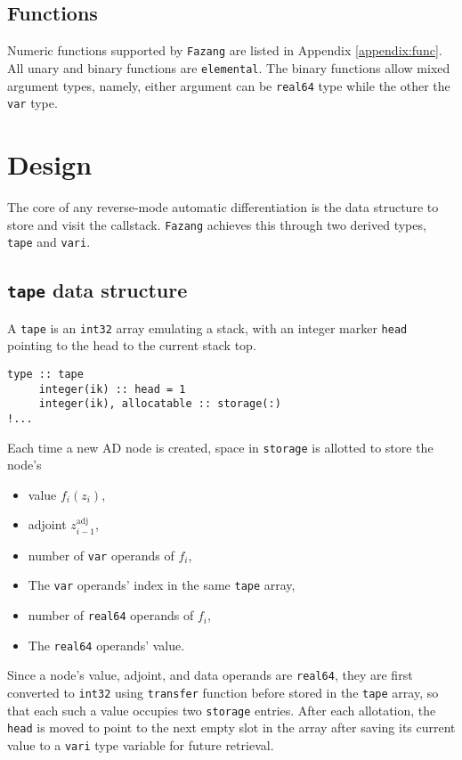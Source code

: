 \documentclass[12pt, reqno, oneside]{amsbook}
\begin{document}
\section{Functions}
\label{sec:orgd457f45}
Numeric functions supported by \texttt{Fazang} are listed in Appendix \ref{appendix:func}. All unary and
binary functions are \texttt{elemental}. The binary functions allow mixed
argument types, namely, either argument can be \texttt{real64} type while the
other the \texttt{var} type.

\chapter{Design}
\label{sec:org148af80}
The core of any reverse-mode automatic differentiation is the data
structure to store and visit the callstack. \texttt{Fazang} achieves this
through two derived types, \texttt{tape} and \texttt{vari}.

\section{\texttt{tape} data structure}
\label{sec:org1c22665}
A \texttt{tape} is an \texttt{int32} array emulating a stack, with an integer marker \texttt{head} pointing to the
head to the current stack top.
\begin{verbatim}
type :: tape
     integer(ik) :: head = 1
     integer(ik), allocatable :: storage(:)
!...
\end{verbatim}
Each time a new AD node is created,
space in \texttt{storage} is allotted to store the node's
\begin{itemize}
\item value \(f_i(z_i)\),
\item adjoint \(z_{i-1}^{\text{adj}}\),
\item number of \texttt{var} operands of \(f_i\),
\item The \texttt{var} operands' index in the same \texttt{tape} array,
\item number of \texttt{real64} operands of \(f_i\),
\item The \texttt{real64} operands' value.
\end{itemize}

Since a node's value, adjoint, and data
operands are \texttt{real64}, they are first converted to \texttt{int32} using
\texttt{transfer} function before stored in the \texttt{tape} array, so that each such
a value occupies two \texttt{storage} entries. After each
allotation, the \texttt{head} is moved to point to the next empty slot in
the array after saving its current value to a \texttt{vari} type variable
for future retrieval.
\end{document}
